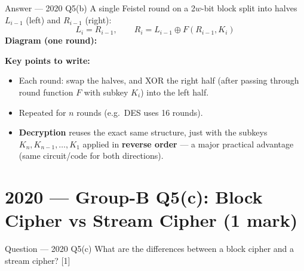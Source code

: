\documentclass[12pt,a4paper]{article}
\begin{document}
\begin{solbox}{Answer --- 2020 Q5(b)}
A single Feistel round on a 2$w$-bit block split into halves $L_{i-1}$ (left) and $R_{i-1}$ (right):
\[
L_i = R_{i-1}, \qquad R_i = L_{i-1} \oplus F(R_{i-1}, K_i)
\]
\textbf{Diagram (one round):}
\begin{center}
\end{center}
\textbf{Key points to write:}
\begin{itemize}[noitemsep]
  \item Each round: swap the halves, and XOR the right half (after passing through round function $F$ with subkey $K_i$) into the left half.
  \item Repeated for $n$ rounds (e.g.\ DES uses 16 rounds).
  \item \textbf{Decryption} reuses the exact same structure, just with the subkeys $K_n, K_{n-1}, \dots, K_1$ applied in \textbf{reverse order} --- a major practical advantage (same circuit/code for both directions).
\end{itemize}
\end{solbox}

\newpage
\section{2020 --- Group-B Q5(c): Block Cipher vs Stream Cipher (1 mark)}

\begin{qbox}{Question --- 2020 Q5(c)}
What are the differences between a block cipher and a stream cipher? \hfill [1]
\end{qbox}
\end{document}
